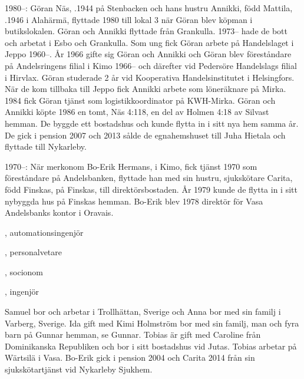 1980--:
Göran Näs, .1944 på Stenbacken och hans hustru Annikki, född Mattila, .1946 i Alahärmä, flyttade 1980 till lokal 3 när Göran blev köpman i butikslokalen. Göran och Annikki flyttade från Grankulla. 1973-- hade de bott och arbetat i Esbo och Grankulla. Som ung fick Göran arbete på Handelslaget i Jeppo 1960--. År 1966 gifte sig Göran	och Annikki och Göran blev föreståndare på Andelsringens filial i Kimo 1966-- och därefter vid Pedersöre Handelslags filial i Hirvlax. Göran studerade 2 år vid Kooperativa Handelsinstitutet i Helsingfors. När de 	kom tillbaka till Jeppo fick Annikki arbete som löneräknare på Mirka. 1984 fick Göran tjänst som logistikkoordinator på KWH-Mirka. Göran och Annikki köpte 1986 en tomt, Näs 4:118, en del av Holmen 4:18	av Silvast hemman. De byggde ett bostadshus och kunde flytta in i sitt nya hem samma år. De gick i pension 2007 och 2013 sålde de egnahemshuset till Juha Hietala och flyttade till Nykarleby.

1970--:
När merkonom Bo-Erik Hermans,  i Kimo, fick tjänst 1970	som föreståndare på Andelsbanken, flyttade han med sin hustru,	sjukskötare Carita, född Finskas,  på Finskas, till direktörsbostaden. År 1979 kunde de flytta in i sitt nybyggda hus på Finskas hemman. Bo-Erik blev 1978 direktör för Vasa Andelsbanks kontor i Oravais.
\begin{jhchildren}
  \item {}, automationsingenjör
  \item {}, personalvetare
  \item {}, socionom
  \item {}, ingenjör
\end{jhchildren}
Samuel bor och arbetar i Trollhättan, Sverige och Anna bor med sin 	familj i Varberg, Sverige. Ida gift med Kimi Holmström bor med sin familj, man och fyra barn på Gunnar hemman, se Gunnar. Tobias är gift	med Caroline från Dominikanska Republiken och bor i sitt bostadshus vid Jutas. Tobias arbetar på Wärtsilä i Vasa. Bo-Erik gick i pension 2004 och Carita 2014 från sin sjukskötartjänst vid Nykarleby Sjukhem.


